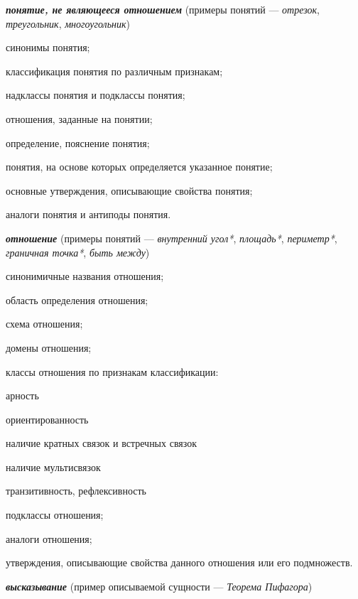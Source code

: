 \textbf{\textit{понятие, не являющееся отношением}} (примеры понятий --- \textit{отрезок}, \textit{треугольник}, \textit{многоугольник})

\begin{textitemize}
	\item синонимы понятия;
	\item классификация понятия по различным признакам;
	\item надклассы понятия и подклассы понятия;
	\item отношения, заданные на понятии;
	\item определение, пояснение понятия;
	\item понятия, на основе которых определяется указанное понятие;
	\item основные утверждения, описывающие свойства понятия;
	\item аналоги понятия и антиподы понятия.
\end{textitemize}

\textbf{\textit{отношение}} (примеры понятий --- \textit{внутренний угол*}, \textit{площадь*}, \textit{периметр*}, \textit{граничная точка*}, \textit{быть между\scnrolesign})

\begin{textitemize}
	\item синонимичные названия отношения;
	\item область определения отношения;
	\item схема отношения;
	\item домены отношения;
	\item классы отношения по признакам классификации:
	\begin{textitemize}
		\item арность
		\item ориентированность
		\item наличие кратных связок и встречных связок
		\item наличие мультисвязок
		\item транзитивность, рефлексивность
	\end{textitemize}
	\item подклассы отношения;
	\item аналоги отношения;
	\item утверждения, описывающие свойства данного отношения или его подмножеств.
\end{textitemize}

\textbf{\textit{высказывание}} (пример описываемой сущности --- \textit{Теорема Пифагора})

